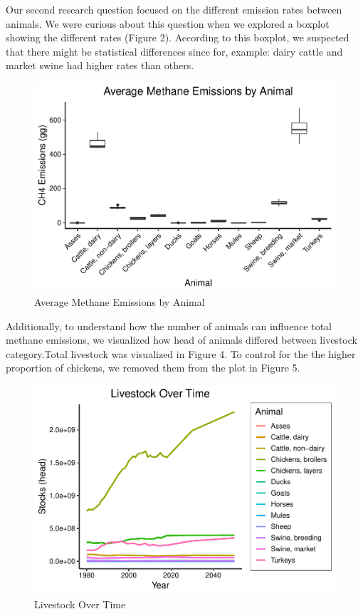 \documentclass[
  12pt,
]{article}
\begin{document}
Our second research question focused on the different emission rates
between animals. We were curious about this question when we explored a
boxplot showing the different rates (Figure 2). According to this
boxplot, we suspected that there might be statistical differences since
for, example: dairy cattle and market swine had higher rates than
others.

\begin{figure}
\centering
\includegraphics{Methane_Project_Template_files/figure-latex/viewing boxplot of methane by animal-1.pdf}
\caption{Average Methane Emissions by Animal}
\end{figure}

Additionally, to understand how the number of animals can influence
total methane emissions, we visualized how head of animals differed
between livestock category.Total livestock was visualized in Figure 4.
To control for the the higher proportion of chickens, we removed them
from the plot in Figure 5.

\begin{figure}
\centering
\includegraphics{Methane_Project_Template_files/figure-latex/animal.head-1.pdf}
\caption{Livestock Over Time}
\end{figure}
\end{document}
